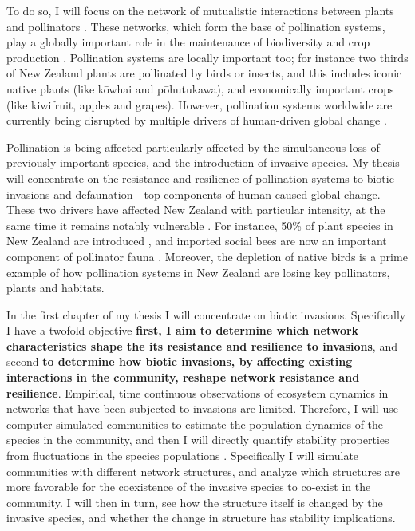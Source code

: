 \documentclass[a4paper]{article}
\begin{document}
To do so, I will focus on the network of mutualistic interactions between plants and pollinators \cite{Bascompte2006, Bascompte2007, Klein2007}.
These networks, which form the base of pollination systems, play a globally important role in the maintenance of biodiversity and crop production \cite{Bascompte2007, Klein2007}.
Pollination systems are locally important too; for instance two thirds of New Zealand plants are pollinated by birds or insects\cite{Cox2000}, and this includes iconic native plants (like k\={o}whai and p\={o}hutukawa), and economically important crops (like kiwifruit, apples and grapes). However, pollination systems worldwide are currently being disrupted by multiple drivers of human-driven global change \cite{Cox2000}.

Pollination is being affected particularly affected by the simultaneous loss of previously important species, and the introduction of invasive species.
My thesis will concentrate on the resistance and resilience of pollination systems to biotic invasions and defaunation---top components of human-caused global change.
These two drivers have affected New Zealand with particular intensity, at the same time it remains notably vulnerable \cite{Vitousek1997}.
For instance, 50\% of plant species in New Zealand are introduced \cite{Wilton2000}, and imported social bees are now an important component of pollinator fauna \cite{Lloyd1985, Newstrom2005}.
Moreover, the depletion of native birds \cite{Anderson2003, Robertson2009} is a prime example of how pollination systems in New Zealand are losing key pollinators, plants and habitats\cite{Cox2000}.

In the first chapter of my thesis I will concentrate on biotic invasions.
Specifically I have a twofold objective \textbf{first, I aim to determine which network characteristics shape the its resistance and resilience to invasions}, and second \textbf{to determine how biotic invasions, by affecting existing interactions in the community, reshape network resistance and resilience}.
Empirical, time continuous observations of ecosystem dynamics in networks that have been subjected to invasions are limited.
Therefore, I will use computer simulated communities to estimate the population dynamics of the species in the community, and then I will directly quantify stability properties from fluctuations in the species populations \cite{Bastolla2009, Garcia-Algarra2013}.
Specifically I will simulate communities with different network structures, and analyze which structures are more favorable for the coexistence of the invasive species to co-exist in the community.
I will then in turn, see how the structure itself is changed by the invasive species, and whether the change in structure has stability implications.
\end{document}
